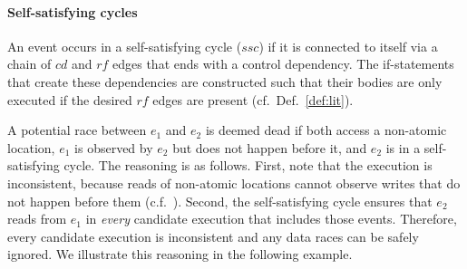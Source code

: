 \paragraph{Self-satisfying cycles}

An event occurs in a self-satisfying cycle ($ssc$) if it is connected
to itself via a chain of $cd$ and $rf$ edges that ends with a control
dependency. The if-statements that create these dependencies are
constructed such that their bodies are only executed if the desired
$rf$ edges are present (cf.~Def.~\ref{def:lit}).

A potential race between $e_1$ and $e_2$ is deemed dead if both access
a non-atomic location, $e_1$ is observed by $e_2$ but does not happen
before it, and $e_2$ is in a self-satisfying cycle. The reasoning is
as follows. First, note that the execution is inconsistent, because
reads of non-atomic locations cannot observe writes that do not happen
before them (c.f.~). Second, the self-satisfying
cycle ensures that $e_2$ reads from $e_1$ in \emph{every} candidate
execution that includes those events. Therefore, every candidate
execution is inconsistent and any data races can be safely ignored. We
illustrate this reasoning in the following example.

